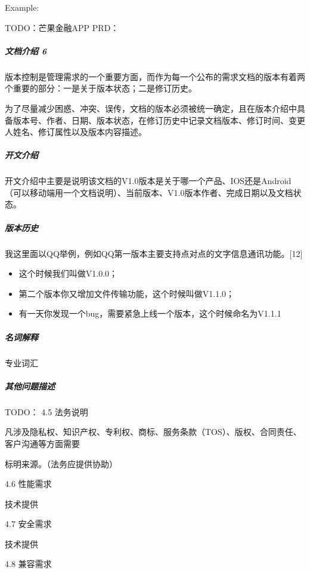 \documentclass[letterpaper,11pt,english]{sphinxmanual}
\begin{document}
Example: 

TODO：芒果金融APP PRD：


\subparagraph{文档介绍 6\sphinxfootnotemark[493]}
\label{\detokenize{chapter_knowledge/PRD:id14}}%
\begin{footnotetext}[493]\sphinxAtStartFootnote
{}
%
\end{footnotetext}\ignorespaces 
版本控制是管理需求的一个重要方面，而作为每一个公布的需求文档的版本有着两个重要的部分：一是关于版本状态；二是修订历史。

为了尽量减少困惑、冲突、误传，文档的版本必须被统一确定，且在版本介绍中具备版本号、作者、日期、版本状态，在修订历史中记录文档版本、修订时间、变更人姓名、修订属性以及版本内容描述。


\subparagraph{开文介绍}
\label{\detokenize{chapter_knowledge/PRD:id15}}
开文介绍中主要是说明该文档的V1.0版本是关于哪一个产品、IOS还是Android（可以移动端用一个文档说明）、当前版本、V1.0版本作者、完成日期以及文档状态。


\subparagraph{版本历史}
\label{\detokenize{chapter_knowledge/PRD:id16}}
我这里面以QQ举例，例如QQ第一版本主要支持点对点的文字信息通讯功能。{[}12{]}
\begin{itemize}
\item {} 
这个时候我们叫做V1.0.0；

\item {} 
​第二个版本你又增加文件传输功能，这个时候叫做V1.1.0；

\item {} 
​有一天你发现一个bug，需要紧急上线一个版本，这个时候命名为V1.1.1

\end{itemize}


\subparagraph{名词解释}
\label{\detokenize{chapter_knowledge/PRD:id17}}
专业词汇


\subparagraph{其他问题描述}
\label{\detokenize{chapter_knowledge/PRD:id18}}
TODO： 4.5 法务说明

凡涉及隐私权、知识产权、专利权、商标、服务条款（TOS）、版权、合同责任、客户沟通等方面需要

标明来源。（法务应提供协助）

4.6 性能需求

技术提供

4.7 安全需求

技术提供

4.8 兼容需求
\end{document}
